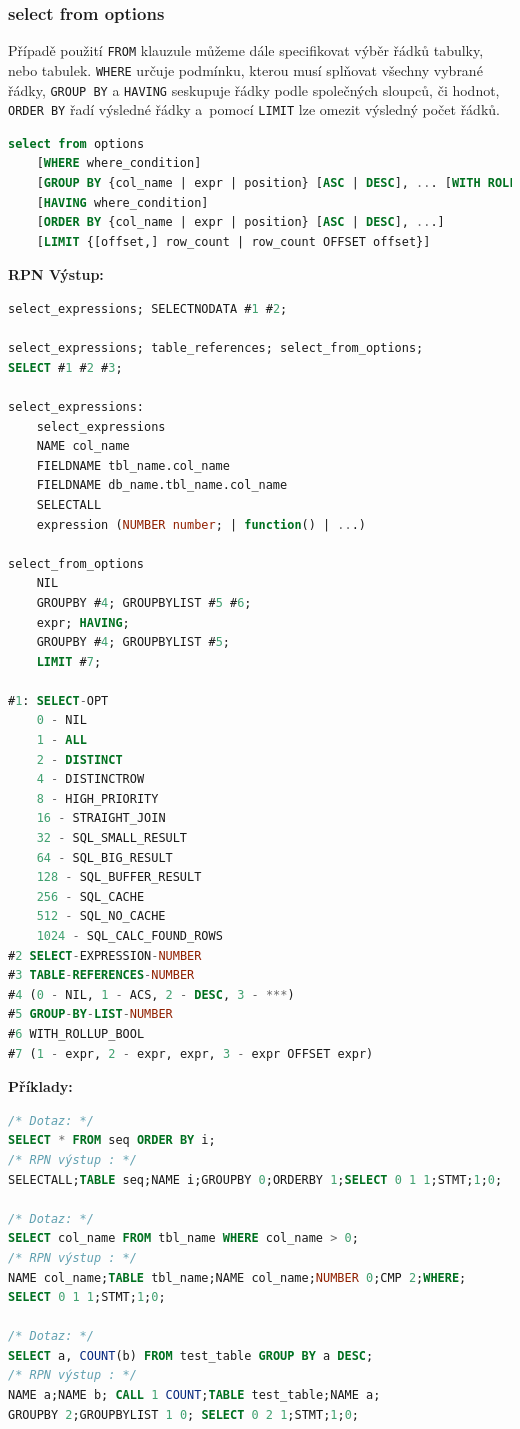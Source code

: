 \subsubsection{select from options} \label{subsubsec:6:selectfromopt}
Případě použití \texttt{FROM} klauzule můžeme dále specifikovat výběr řádků tabulky, nebo tabulek. \texttt{WHERE} určuje podmínku,
kterou musí splňovat všechny vybrané řádky, \texttt{GROUP BY} a \texttt{HAVING} seskupuje řádky podle společných sloupců, či hodnot,
\texttt{ORDER BY} řadí výsledné řádky a~pomocí \texttt{LIMIT} lze omezit výsledný počet řádků.
\begin{lstlisting}[language=sql]
select from options
    [WHERE where_condition]
    [GROUP BY {col_name | expr | position} [ASC | DESC], ... [WITH ROLLUP]]
    [HAVING where_condition]
    [ORDER BY {col_name | expr | position} [ASC | DESC], ...]
    [LIMIT {[offset,] row_count | row_count OFFSET offset}]
\end{lstlisting}

\vspace*{\baselineskip}
\textbf{RPN Výstup:}
\begin{lstlisting}[language=sql]
select_expressions; SELECTNODATA #1 #2;

select_expressions; table_references; select_from_options; 
SELECT #1 #2 #3;

select_expressions:
    select_expressions
    NAME col_name
    FIELDNAME tbl_name.col_name
    FIELDNAME db_name.tbl_name.col_name
    SELECTALL
    expression (NUMBER number; | function() | ...)

select_from_options
    NIL
    GROUPBY #4; GROUPBYLIST #5 #6;
    expr; HAVING;
    GROUPBY #4; GROUPBYLIST #5;
    LIMIT #7;

#1: SELECT-OPT
    0 - NIL
    1 - ALL
    2 - DISTINCT
    4 - DISTINCTROW
    8 - HIGH_PRIORITY
    16 - STRAIGHT_JOIN
    32 - SQL_SMALL_RESULT
    64 - SQL_BIG_RESULT
    128 - SQL_BUFFER_RESULT
    256 - SQL_CACHE
    512 - SQL_NO_CACHE
    1024 - SQL_CALC_FOUND_ROWS
#2 SELECT-EXPRESSION-NUMBER
#3 TABLE-REFERENCES-NUMBER
#4 (0 - NIL, 1 - ACS, 2 - DESC, 3 - ***)
#5 GROUP-BY-LIST-NUMBER
#6 WITH_ROLLUP_BOOL
#7 (1 - expr, 2 - expr, expr, 3 - expr OFFSET expr)
\end{lstlisting}
\vspace*{\baselineskip}
\textbf{Příklady:}
\begin{lstlisting}[language=sql]
/* Dotaz: */
SELECT * FROM seq ORDER BY i;
/* RPN výstup : */
SELECTALL;TABLE seq;NAME i;GROUPBY 0;ORDERBY 1;SELECT 0 1 1;STMT;1;0;

/* Dotaz: */
SELECT col_name FROM tbl_name WHERE col_name > 0;
/* RPN výstup : */
NAME col_name;TABLE tbl_name;NAME col_name;NUMBER 0;CMP 2;WHERE;
SELECT 0 1 1;STMT;1;0;

/* Dotaz: */
SELECT a, COUNT(b) FROM test_table GROUP BY a DESC;
/* RPN výstup : */
NAME a;NAME b; CALL 1 COUNT;TABLE test_table;NAME a;
GROUPBY 2;GROUPBYLIST 1 0; SELECT 0 2 1;STMT;1;0;
\end{lstlisting}

